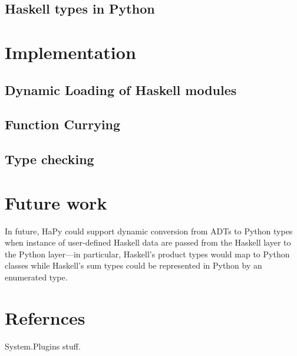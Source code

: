 \documentclass[11pt, letterpaper, oneside, twocolumn] {article}
\begin{document}
\subsection{Haskell types in Python}

\section{Implementation}

\subsection{Dynamic Loading of Haskell modules}

\subsection{Function Currying}

\subsection{Type checking}

\section{Future work}
In future, HaPy could support dynamic conversion from ADTs to Python types when instance of user-defined Haskell data are passed from the Haskell layer to the Python layer---in particular, Haskell's product types would map to Python classes while Haskell's sum types could be represented in Python by an enumerated type. 

\section{Refernces}
System.Plugins stuff.
\end{document}
